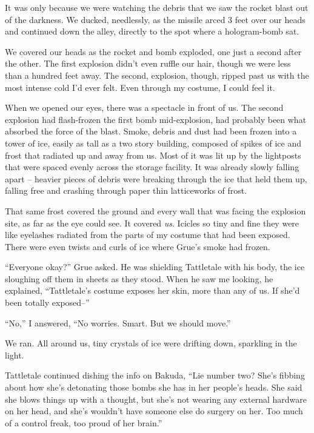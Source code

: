 It was only because we were watching the debris that we saw the rocket blast out of the darkness.  We ducked, needlessly, as the missile arced 3 feet over our heads and continued down the alley, directly to the spot where a hologram-bomb sat.



We covered our heads as the rocket and bomb exploded, one just a second after the other.  The first explosion didn't even ruffle our hair, though we were less than a hundred feet away.  The second, explosion, though, ripped past us with the most intense cold I'd ever felt.  Even through my costume, I could feel it.



When we opened our eyes, there was a spectacle in front of us.  The second explosion had flash-frozen the first bomb mid-explosion, had probably been what absorbed the force of the blast.  Smoke, debris and dust had been frozen into a tower of ice, easily as tall as a two story building, composed of spikes of ice and frost that radiated up and away from us.  Most of it was lit up by the lightposts that were spaced evenly across the storage facility.  It was already slowly falling apart – heavier pieces of debris were breaking through the ice that held them up, falling free and crashing through paper thin latticeworks of frost.



That same frost covered the ground and every wall that was facing the explosion site, as far as the eye could see.  It covered \emph{us}.  Icicles so tiny and fine they were like eyelashes radiated from the parts of my costume that had been exposed.  There were even twists and curls of ice where Grue's smoke had frozen.



``Everyone okay?'' Grue asked.  He was shielding Tattletale with his body, the ice sloughing off them in sheets as they stood.  When he saw me looking, he explained, ``Tattletale's costume exposes her skin, more than any of us.  If she'd been totally exposed--''



``No,'' I answered, ``No worries.  Smart.  But we should move.''



We ran.  All around us, tiny crystals of ice were drifting down, sparkling in the light.



Tattletale continued dishing the info on Bakuda, ``Lie number two?  She's fibbing about how she's detonating those bombs she has in her people's heads.  She said she blows things up with a thought, but she's not wearing any external hardware on her head, and she's  wouldn't have someone else do surgery on her.  Too much of a control freak, too proud of her brain.''




